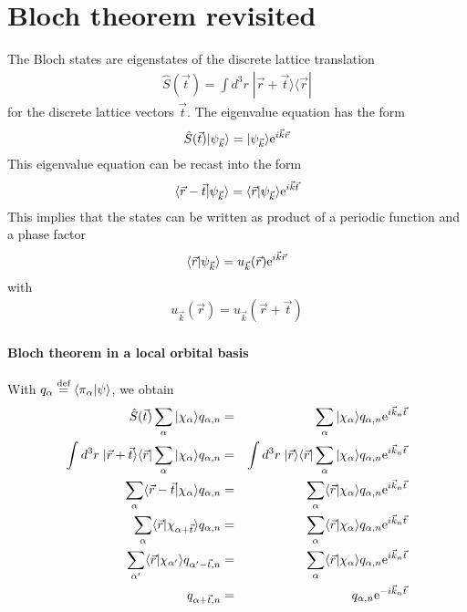 \documentclass[11pt,a4paper]{report}
\begin{document}
\chapter{Bloch theorem revisited}
The Bloch states are eigenstates of the discrete lattice translation 
\begin{eqnarray}
\hat{S}(\vec{t})=\int d^3r\;|\vec{r}+\vec{t}\rangle\langle\vec{r}|
\end{eqnarray}
for the discrete lattice vectors $\vec{t}$. The eigenvalue equation has the form
\begin{eqnarray}
\hat{S}(\vec{t})|\psi_{\vec{k}}\rangle=|\psi_{\vec{k}}\rangle
\mathrm{e}^{i\vec{k}\vec{r}}
\end{eqnarray}
This eigenvalue equation can be recast into the form
\begin{eqnarray}
\langle\vec{r}-\vec{t}|\psi_{\vec{k}}\rangle=\langle\vec{r}|\psi_{\vec{k}}\rangle
\mathrm{e}^{i\vec{k}\vec{t}}
\end{eqnarray}
This implies that the states can be written  as product of a periodic function and a phase factor
\begin{eqnarray}
\langle\vec{r}|\psi_{\vec{k}}\rangle=u_{\vec{k}}(\vec{r})\mathrm{e}^{i\vec{k}\vec{r}}
\end{eqnarray}
with
\begin{eqnarray}
u_{\vec{k}}(\vec{r})=u_{\vec{k}}(\vec{r}+\vec{t})
\end{eqnarray}

\subsubsection{Bloch theorem in a local orbital basis}
With $q_\alpha\stackrel{\text{def}}{=} \langle\pi_\alpha|\psi\rangle$, we obtain
\begin{eqnarray}
\hat{S}(\vec{t})\sum_\alpha|\chi_\alpha\rangle q_{\alpha,n}
&=&
\sum_\alpha|\chi_\alpha\rangle q_{\alpha,n}\mathrm{e}^{i\vec{k}_n\vec{t}}
\nonumber\\
\int d^3r\;|\vec{r}+\vec{t}\rangle\langle\vec{r}|
\sum_\alpha|\chi_\alpha\rangle q_{\alpha,n}
&=&
\int d^3r\;|\vec{r}\rangle\langle\vec{r}|
\sum_\alpha|\chi_\alpha\rangle q_{\alpha,n}\mathrm{e}^{i\vec{k}_n\vec{t}}
\nonumber\\
\sum_\alpha\langle\vec{r}-\vec{t}|\chi_\alpha\rangle q_{\alpha,n}
&=&
\sum_\alpha
\langle\vec{r}|\chi_\alpha\rangle q_{\alpha,n}\mathrm{e}^{i\vec{k}_n\vec{t}}
\nonumber\\
\sum_\alpha\langle\vec{r}|\chi_{\alpha+\vec{t}}\rangle q_{\alpha,n}
&=&
\sum_\alpha
\langle\vec{r}|\chi_\alpha\rangle q_{\alpha,n}\mathrm{e}^{i\vec{k}_n\vec{t}}
\nonumber\\
\sum_{\alpha'}\langle\vec{r}|\chi_{\alpha'}\rangle q_{\alpha'-\vec{t},n}
&=&
\sum_\alpha
\langle\vec{r}|\chi_\alpha\rangle q_{\alpha,n}\mathrm{e}^{i\vec{k}_n\vec{t}}
\nonumber\\
q_{\alpha+\vec{t},n}&=&q_{\alpha,n}\mathrm{e}^{-i\vec{k}_n\vec{t}}
\end{eqnarray}
\end{document}
